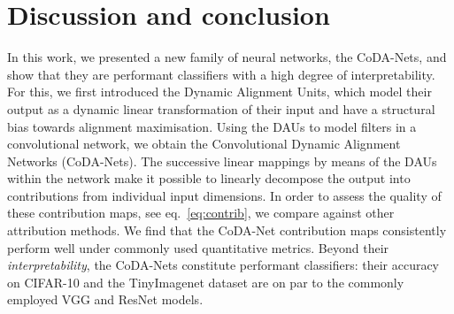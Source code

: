 \section{Discussion and conclusion}
\label{sec:discussion}
In this work, we presented a new family of neural networks, the CoDA-Nets, 
and show that they are performant classifiers with a high degree of interpretability.
For this, we first introduced the Dynamic Alignment Units, which model their output as a dynamic linear transformation of their input and have a structural bias towards alignment maximisation.
    Using the DAUs to model filters in a convolutional network, we obtain the Convolutional Dynamic Alignment Networks (CoDA-Nets).
The successive linear mappings by means of the DAUs within the network make it possible to linearly decompose the output into contributions from individual input dimensions. 
In order to assess the quality of these contribution maps,
    see eq.~\eqref{eq:contrib}, we compare against other attribution methods.
    We find that the CoDA-Net contribution maps consistently perform well under commonly used quantitative metrics.
    Beyond their \emph{interpretability},
        the CoDA-Nets constitute performant classifiers: their accuracy on CIFAR-10 and the TinyImagenet dataset are on par to the commonly employed VGG and ResNet models.
